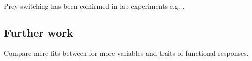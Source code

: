 \documentclass[11pt]{article}
\begin{document}
                Prey switching has been confirmed in lab experiments e.g. \citep{akre1979switching}\citep{oaten1975functional}\citep{elliott2004prey}.
            
            \subsection{Further work}
            
                Compare more fits between for more variables and traits of functional responses.
        
    
    
    
        
\end{document}
